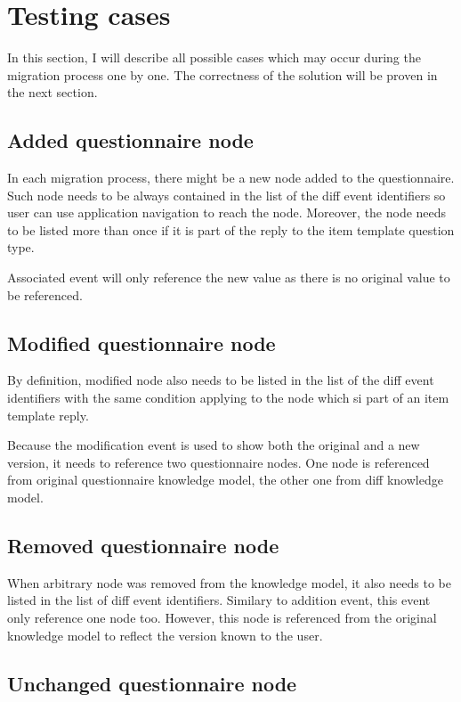 \section{Testing cases}\label{sec:testing-cases}

In this section, I will describe all possible cases which may occur during the migration process one by one.
The correctness of the solution will be proven in the next section.

\subsection{Added questionnaire node}

In each migration process, there might be a new node added to the questionnaire.
Such node needs to be always contained in the list of the diff event identifiers so user can use application navigation to reach the node.
Moreover, the node needs to be listed more than once if it is part of the reply to the item template question type.

Associated event will only reference the new value as there is no original value to be referenced.

\subsection{Modified questionnaire node}

By definition, modified node also needs to be listed in the list of the diff event identifiers with the same condition applying to the node which si part of an item template reply.

Because the modification event is used to show both the original and a new version, it needs to reference two questionnaire nodes.
One node is referenced from original questionnaire knowledge model, the other one from diff knowledge model.

\subsection{Removed questionnaire node}

When arbitrary node was removed from the knowledge model, it also needs to be listed in the list of diff event identifiers.
Similary to addition event, this event only reference one node too.
However, this node is referenced from the original knowledge model to reflect the version known to the user.

\subsection{Unchanged questionnaire node}


